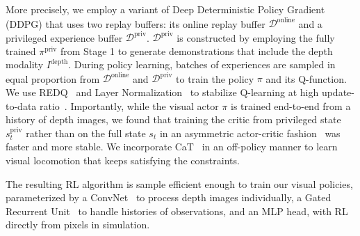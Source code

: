 More precisely, we employ a variant of Deep Deterministic Policy Gradient~\citep{lillicrap2015continuous} (DDPG) that uses two replay buffers: its online replay buffer $\mathcal{D}^\text{online}$ and a privileged experience buffer $\mathcal{D}^\text{priv}$. 
$\mathcal{D}^\text{priv}$ is constructed by employing the fully trained $\pi^\text{priv}$ from Stage 1 to generate demonstrations that include the depth modality $I^\text{depth}$.
During policy learning, batches of experiences are sampled in equal proportion from $\mathcal{D}^\text{online}$ and $\mathcal{D}^\text{priv}$ to train the policy $\pi$ and its Q-function.
We use REDQ~\citep{chen2021randomized} and Layer Normalization~\citep{ba2016layer} to stabilize Q-learning at high update-to-data ratio~\citep{smith2022walk, ball2023efficient, smith2023learning}.
Importantly, while the visual actor $\pi$ is trained end-to-end from a history of depth images, we found that training the critic from privileged state $s^\text{priv}_t$ rather than on the full state $s_t$ in an asymmetric actor-critic fashion~\citep{pinto2017asymmetric} was faster and more stable.
We incorporate CaT~\citep{chane2024cat} in an off-policy manner to learn visual locomotion that keeps satisfying the constraints.

The resulting RL algorithm is sample efficient enough to train our visual policies, parameterized by a ConvNet~\citep{lecun1998gradient} to process depth images individually, a Gated Recurrent Unit~\citep{chung2014empirical} to handle histories of observations, and an MLP head, with RL directly from pixels in simulation.

